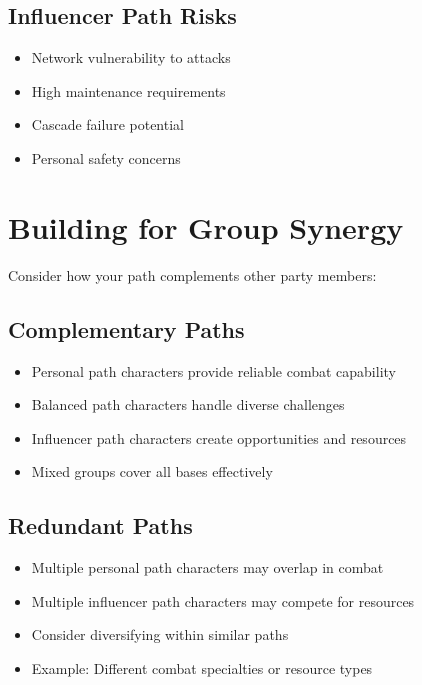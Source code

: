 \documentclass[11pt,twoside,openany]{book}
\begin{document}
\subsection*{Influencer Path Risks}

\begin{itemize}
\item Network vulnerability to attacks
\item High maintenance requirements
\item Cascade failure potential
\item Personal safety concerns
\end{itemize}

\section*{Building for Group Synergy} 

Consider how your path complements other party members:

\subsection*{Complementary Paths}

\begin{itemize}
\item Personal path characters provide reliable combat capability
\item Balanced path characters handle diverse challenges
\item Influencer path characters create opportunities and resources
\item Mixed groups cover all bases effectively
\end{itemize}

\subsection*{Redundant Paths}

\begin{itemize}
\item Multiple personal path characters may overlap in combat
\item Multiple influencer path characters may compete for resources
\item Consider diversifying within similar paths
\item Example: Different combat specialties or resource types
\end{itemize}
\end{document}
